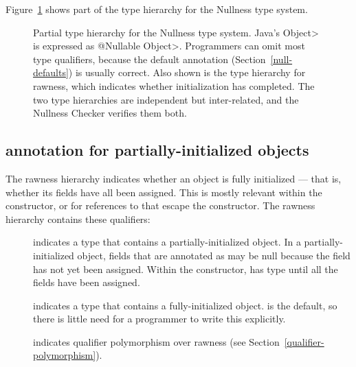 Figure~\ref{fig:nonnull-hierarchy} shows part of the type hierarchy for the
Nullness type system.


\begin{figure}
\begin{center}
\end{center}
\vspace{-1.5\baselineskip}
\caption{Partial type hierarchy for the Nullness type system.
Java's \<Object> is expressed as \<@Nullable Object>.  Programmers can omit
most type qualifiers, because the default annotation
(Section~\ref{null-defaults}) is usually correct.  Also shown is the
type hierarchy for rawness, which indicates whether
initialization has completed.  The two type hierarchies are independent but
inter-related, and the Nullness Checker verifies them both.}
\label{fig:nonnull-hierarchy}
\end{figure}


\subsection{ annotation for partially-initialized objects\label{raw-partially-initialized}}

The rawness hierarchy indicates whether an object is fully initialized ---
that is, whether its fields have all been assigned.  This is mostly
relevant within the constructor, or for references to  that
escape the constructor.  The rawness hierarchy contains these qualifiers:

\begin{description}

\item[]
  indicates a type that contains a partially-initialized object.  In a
  partially-initialized object, fields that are annotated as
   may be null because the field
  has not yet been assigned.  Within the constructor,
   has  type until all
  the fields have been assigned.

\item[]
  indicates a type that contains a fully-initialized object.  
  is the default, so there is little need for a programmer to write this
  explicitly.

\item[]
  indicates qualifier polymorphism over rawness (see
  Section~\ref{qualifier-polymorphism}).

\end{description}

